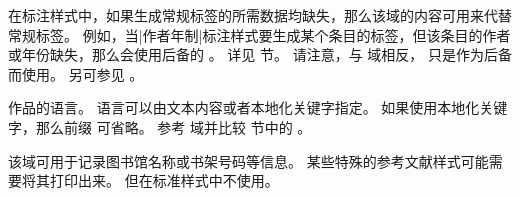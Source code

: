 \begin{fieldlist}


在标注样式中，如果生成常规标签的所需数据均缺失，那么该域的内容可用来代替常规标签。
例如，当|作者年制|标注样式要生成某个条目的标签，但该条目的作者或年份缺失，那么会使用后备的 。
详见  节。
请注意，与  域相反， 只是作为后备而使用。
另可参见 。




作品的语言。
语言可以由文本内容或者本地化关键字指定。
如果使用本地化关键字，那么前缀  可省略。
参考  域并比较  节中的 。




该域可用于记录图书馆名称或书架号码等信息。
某些特殊的参考文献样式可能需要将其打印出来。
但在标准样式中不使用。




\end{fieldlist}
